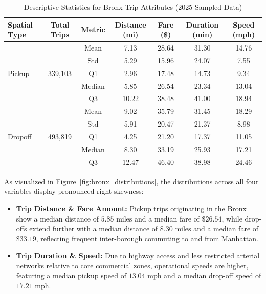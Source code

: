 \documentclass[11pt,a4paper]{article}
\begin{document}
\begin{table}[htbp]
    \centering
    \caption{Descriptive Statistics for Bronx Trip Attributes (2025 Sampled Data)}
    \label{tab:bronx_stats}
    \small
    \begin{tabular}{lcccccc}
        \toprule
        \textbf{Spatial Type} & \textbf{Total Trips} & \textbf{Metric} & \textbf{Distance (mi)} & \textbf{Fare (\$)} & \textbf{Duration (min)} & \textbf{Speed (mph)} \\
        \midrule
        \multirow{5}{*}{Pickup} & \multirow{5}{*}{339,103} 
        & Mean & 7.13 & 28.64 & 31.30 & 14.76 \\
        & & Std & 5.29 & 15.96 & 24.07 & 7.55 \\
        & & Q1 & 2.96 & 17.48 & 14.73 & 9.34 \\
        & & Median & 5.85 & 26.54 & 23.34 & 13.04 \\
        & & Q3 & 10.22 & 38.48 & 41.00 & 18.94 \\
        \midrule
        \multirow{5}{*}{Dropoff} & \multirow{5}{*}{493,819} 
        & Mean & 9.02 & 35.79 & 31.45 & 18.29 \\
        & & Std & 5.91 & 20.47 & 21.37 & 8.98 \\
        & & Q1 & 4.25 & 21.20 & 17.37 & 11.05 \\
        & & Median & 8.30 & 33.19 & 25.93 & 17.21 \\
        & & Q3 & 12.47 & 46.40 & 38.98 & 24.46 \\
        \bottomrule
    \end{tabular}
\end{table}

As visualized in Figure~\ref{fig:bronx_distributions}, the distributions across all four variables display pronounced right-skewness:
\begin{itemize}
    \item \textbf{Trip Distance \& Fare Amount:} Pickup trips originating in the Bronx show a median distance of $5.85\text{ miles}$ and a median fare of $\$26.54$, while drop-offs extend further with a median distance of $8.30\text{ miles}$ and a median fare of $\$33.19$, reflecting frequent inter-borough commuting to and from Manhattan.
    \item \textbf{Trip Duration \& Speed:} Due to highway access and less restricted arterial networks relative to core commercial zones, operational speeds are higher, featuring a median pickup speed of $13.04\text{ mph}$ and a median drop-off speed of $17.21\text{ mph}$.
\end{itemize}
\end{document}
